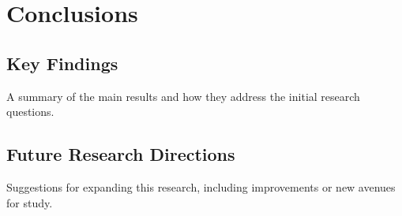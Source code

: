 \documentclass[a4paper,12pt]{report}
\begin{document}
\chapter{Conclusions}

\section{Key Findings}
A summary of the main results and how they address the initial research questions.

\section{Future Research Directions}
Suggestions for expanding this research, including improvements or new avenues for study.

\end{document}
